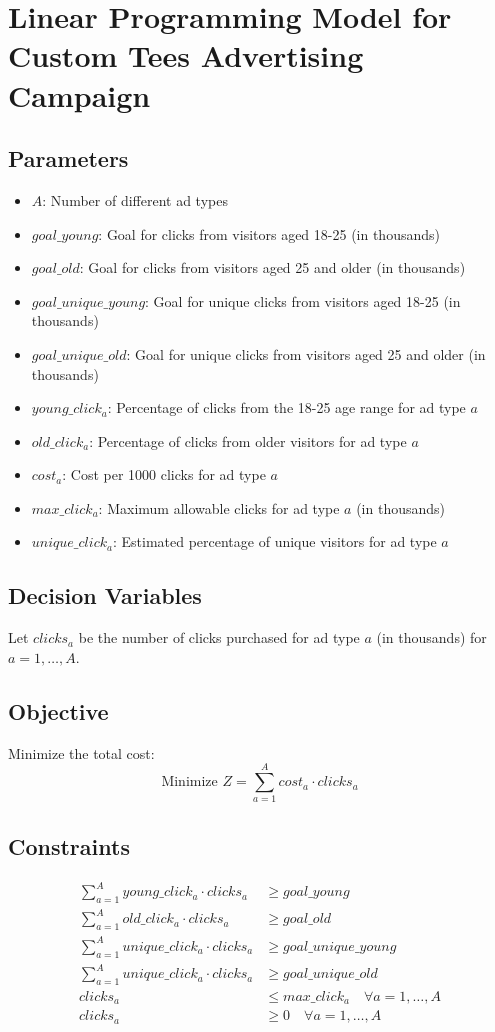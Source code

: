 \documentclass{article}
\begin{document}
\section*{Linear Programming Model for Custom Tees Advertising Campaign}

\subsection*{Parameters}
\begin{itemize}
    \item $A$: Number of different ad types
    \item $goal\_young$: Goal for clicks from visitors aged 18-25 (in thousands)
    \item $goal\_old$: Goal for clicks from visitors aged 25 and older (in thousands)
    \item $goal\_unique\_young$: Goal for unique clicks from visitors aged 18-25 (in thousands)
    \item $goal\_unique\_old$: Goal for unique clicks from visitors aged 25 and older (in thousands)
    \item $young\_click_a$: Percentage of clicks from the 18-25 age range for ad type $a$
    \item $old\_click_a$: Percentage of clicks from older visitors for ad type $a$
    \item $cost_a$: Cost per 1000 clicks for ad type $a$
    \item $max\_click_a$: Maximum allowable clicks for ad type $a$ (in thousands)
    \item $unique\_click_a$: Estimated percentage of unique visitors for ad type $a$
\end{itemize}

\subsection*{Decision Variables}
Let $clicks_a$ be the number of clicks purchased for ad type $a$ (in thousands) for $a = 1, \ldots, A$.

\subsection*{Objective}
Minimize the total cost:
\[
\text{Minimize } Z = \sum_{a=1}^{A} cost_a \cdot clicks_a
\]

\subsection*{Constraints}
\begin{align*}
\sum_{a=1}^{A} young\_click_a \cdot clicks_a & \geq goal\_young \\
\sum_{a=1}^{A} old\_click_a \cdot clicks_a & \geq goal\_old \\
\sum_{a=1}^{A} unique\_click_a \cdot clicks_a & \geq goal\_unique\_young \\
\sum_{a=1}^{A} unique\_click_a \cdot clicks_a & \geq goal\_unique\_old \\
clicks_a & \leq max\_click_a \quad \forall a = 1, \ldots, A \\
clicks_a & \geq 0 \quad \forall a = 1, \ldots, A
\end{align*}
\end{document}
